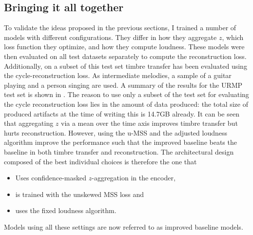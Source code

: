 \subsection{Bringing it all together}
\label{ablations-summary}
To validate the ideas proposed in the previous sections, I trained a number of models with different configurations. They differ in how they aggregate $z$, which loss function they optimize, and how they compute loudness. These models were then evaluated on all test datasets separately to compute the reconstruction loss. Additionally, on a subset of this test set timbre transfer has been evaluated using the cycle-reconstruction loss. As intermediate melodies, a sample of a guitar playing and a person singing are used. A summary of the results for the URMP test set is shown in . The reason to use only a subset of the test set for evaluating the cycle reconstruction loss lies in the amount of data produced: the total size of produced artifacts at the time of writing this is 14.7GB already. \newline
It can be seen that aggregating $z$ via a mean over the time axis improves timbre transfer but hurts reconstruction.
However, using the u-MSS and the adjusted loudness algorithm improve the performance such that the improved baseline beats the baseline in both timbre transfer and reconstruction. 
The architectural design composed of the best individual choices is therefore the one that
\begin{itemize}
    \item Uses confidence-masked $z$-aggregation in the encoder,
    \item is trained with the unskewed MSS loss and
    \item uses the fixed loudness algorithm.
\end{itemize}
Models using all these settings are now referred to as improved baseline models.
